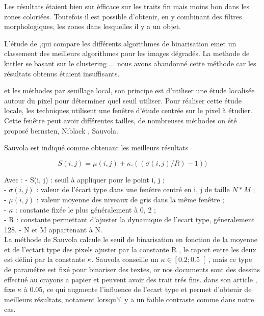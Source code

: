 Les résultats étaient bien sur èfficace sur les traits fin mais moins bon dans les zones coloriées.
Toutefois il est possible d'obtenir, en y combinant des filtres morphologiques, les zones dans lesquelles il y a un objet.



L'étude de ,qui compare les différents algorithmes de binarisation emet un classement des meilleurs algorithmes pour les images dégradés.
La methode de kittler se basant sur le clustering ... nous avons abandonné cette méthode car les résultats obtenus étaient insuffisants.

et les méthodes par seuillage local, son principe est d’utiliser une étude localisée autour du pixel pour déterminer quel seuil utiliser. Pour réaliser cette étude locale, les techniques utilisent une fenêtre d’étude centrée sur le pixel à étudier. Cette fenêtre peut avoir différentes tailles, de nombreuses méthodes on été proposé bernsten, Niblack , Sauvola.

Sauvola est indiqué comme obtenant les meilleurs résultats

\begin{equation}
	S(i,j) = \mu(i,j) + \kappa.((\sigma(i,j)/R)-1))
\end{equation}

Avec :
- S(i, j) : seuil à appliquer pour le point i, j ;\\
- $\sigma(i, j)$ : valeur de l’écart type dans une fenêtre centré en i, j de taille $N * M$ ;\\
- $\mu(i, j)$ : valeur moyenne des niveaux de gris dans la même fenêtre ;\\
- $\kappa$ : constante fixée le plus généralement à 0, 2 ;\\
- R : constante permettant d'ajuster la dynamique de l'ecart type, géneralement 128.
- N et M appartenant à N.\\

La méthode de Sauvola calcule le seuil de binarisation en fonction de la moyenne et de l'ectart type des pixels ajuster par la constante R , le raport entre les deux est défini par la constante $\kappa$.
Sauvola conseille un $\kappa \in \left[ 0.2 ;0.5 \right[$, mais ce type de paramétre est fixé pour binariser des textes, or nos documents sont des dessins effectué au crayons a papier et peuvent avoir des trait trés fins.
dans son article  , fixe $\kappa$ à 0.05, ce qui augmente l'influence de l'ecart type et permet d'obtenir de meilleurs résultats, notament lorsqu'il y a un faible contraste comme dans notre cas.   

